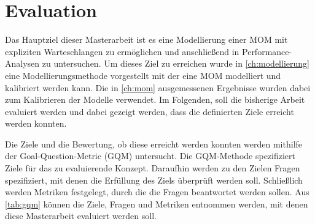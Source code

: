 
\chapter{Evaluation}
\label{ch:Evaluation}
Das Hauptziel dieser Masterarbeit ist es eine Modellierung einer MOM mit expliziten Warteschlangen zu ermöglichen und anschließend in Performance-Analysen zu untersuchen. Um dieses Ziel zu erreichen wurde in \autoref{ch:modellierung} eine Modellierungsmethode vorgestellt mit der eine MOM modelliert und kalibriert werden kann. Die in \autoref{ch:mom} ausgemessenen Ergebnisse wurden dabei zum Kalibrieren der Modelle verwendet. Im Folgenden, soll die bisherige Arbeit evaluiert werden und dabei gezeigt werden, dass die definierten Ziele erreicht werden konnten. 

Die Ziele und die Bewertung, ob diese erreicht werden konnten werden mithilfe der Goal-Question-Metric (GQM) untersucht.
Die GQM-Methode \cite{gqm} spezifiziert Ziele für das zu evaluierende Konzept. Daraufhin werden zu den Zielen Fragen spezifiziert, mit denen die Erfüllung des Ziels überprüft werden soll. Schließlich werden Metriken festgelegt, durch die die Fragen beantwortet werden sollen. Aus \autoref{tab:gqm} können die Ziele, Fragen und Metriken entnommen werden, mit denen diese Masterarbeit evaluiert werden soll.

